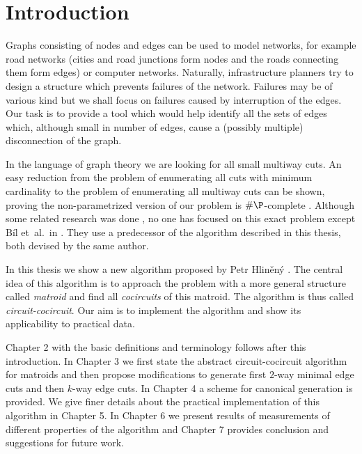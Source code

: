 
\chapter{Introduction}

Graphs consisting of nodes and edges can be used to model networks, for example road networks (cities and road junctions form nodes and the roads connecting them form edges) or computer networks. Naturally, infrastructure planners try to design a structure which prevents failures of the network. Failures may be of various kind but we shall focus on failures caused by interruption of the edges. Our task is to provide a tool which would help identify all the sets of edges which, although small in number of edges, cause a (possibly multiple) disconnection of the graph.

In the language of graph theory we are looking for all small multiway cuts. An easy reduction from the problem of enumerating all cuts with minimum cardinality to the problem of enumerating all multiway cuts can be shown, proving the non-parametrized version of our problem is $\#\P$-complete \cite{Provan1983}. Although some related research was done \cite{cactus}, no one has focused on this exact problem except Bíl et~al.\ in \cite{cdv}. They use a predecessor of the algorithm described in this thesis, both devised by the same author.

In this thesis we show a new algorithm proposed by Petr Hliněný \cite{hlineny_circuitcocircuit}. The central idea of this algorithm is to approach the problem with a more general structure called \textit{matroid} and find all \textit{cocircuits} of this matroid. The algorithm is thus called \textit{circuit-cocircuit}. Our aim is to implement the algorithm and show its applicability to practical data.

Chapter 2 with the basic definitions and terminology follows after this introduction. In Chapter 3 we first state the abstract circuit-cocircuit algorithm for matroids and then propose modifications to generate first $2$-way minimal edge cuts and then $k$-way edge cuts. In Chapter 4 a scheme for canonical generation is provided. We give finer details about the practical implementation of this algorithm in Chapter 5. In Chapter 6 we present results of measurements of different properties of the algorithm and Chapter 7 provides conclusion and suggestions for future work.


